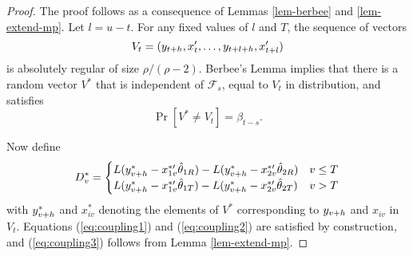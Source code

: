 \documentclass[12pt]{article}
\begin{document}
\begin{proof}
  The proof follows as a consequence of Lemmas \ref{lem-berbee} and
  \ref{lem-extend-mp}.  Let $l = u-t$.  For any fixed values of $l$
  and $T$, the sequence of vectors
  \[ V_{t} = (y_{t+h}, x_{t}', \dots, y_{t+l+h}, x_{t+l}') \] is
  absolutely regular of size $\rho/(\rho-2)$.  Berbee's Lemma implies
  that there is a random vector $V^*$ that is independent of
  $\mathcal{F}_s$, equal to $V_{t}$ in distribution, and satisfies
  \[\Pr[V^* \neq V_{t}] = \beta_{t-s}.\]

  Now define
  \begin{equation*}
    D_v^* =
    \begin{cases}
      L(y_{v+h}^* - x_{1v}^{*\prime} \hat{\theta}_{1R}) - L(y_{v+h}^* -
      x_{2v}^{*\prime} \hat{\theta}_{2R}) & v \leq T \\
      L(y_{v+h}^* - x_{1v}^{*\prime} \hat{\theta}_{1T}) - L(y_{v+h}^* -
      x_{2v}^{*\prime} \hat{\theta}_{2T}) & v > T
    \end{cases}
  \end{equation*}
  with $y_{v+h}^*$ and $x_{iv}^*$ denoting the elements of $V^*$
  corresponding to $y_{v+h}$ and $x_{iv}$ in $V_{t}$.  Equations
  (\ref{eq:coupling1}) and (\ref{eq:coupling2}) are satisfied by
  construction, and (\ref{eq:coupling3}) follows from Lemma
  \ref{lem-extend-mp}.
\end{proof}
\end{document}
